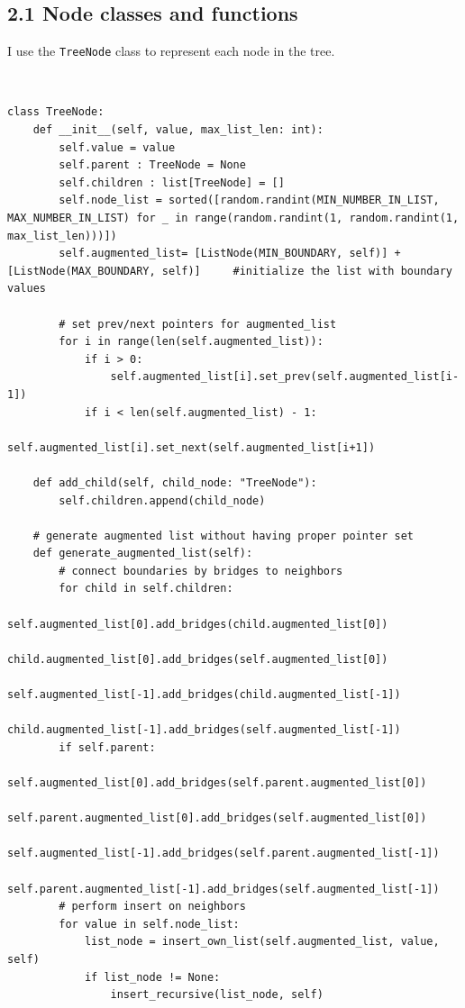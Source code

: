 \documentclass[12pt,english,]{article}
\newcommand{\code}[1]{\colorbox{light-gray}{\texttt{#1}}}
\begin{document}
\hypertarget{section2.1}{%
\subsection{\texorpdfstring{2.1 Node classes and functions}{2.1 Node classes and functions}}\label{section2.1}}

I use the \code{TreeNode} class to represent each node in the tree.

~

\begin{lstlisting}
class TreeNode:
    def __init__(self, value, max_list_len: int):
        self.value = value
        self.parent : TreeNode = None
        self.children : list[TreeNode] = []
        self.node_list = sorted([random.randint(MIN_NUMBER_IN_LIST, MAX_NUMBER_IN_LIST) for _ in range(random.randint(1, random.randint(1, max_list_len)))])
        self.augmented_list= [ListNode(MIN_BOUNDARY, self)] + [ListNode(MAX_BOUNDARY, self)]     #initialize the list with boundary values

        # set prev/next pointers for augmented_list
        for i in range(len(self.augmented_list)):
            if i > 0:
                self.augmented_list[i].set_prev(self.augmented_list[i-1])
            if i < len(self.augmented_list) - 1:
                self.augmented_list[i].set_next(self.augmented_list[i+1])

    def add_child(self, child_node: "TreeNode"):
        self.children.append(child_node)

    # generate augmented list without having proper pointer set
    def generate_augmented_list(self):
        # connect boundaries by bridges to neighbors
        for child in self.children:
            self.augmented_list[0].add_bridges(child.augmented_list[0])
            child.augmented_list[0].add_bridges(self.augmented_list[0])
            self.augmented_list[-1].add_bridges(child.augmented_list[-1])
            child.augmented_list[-1].add_bridges(self.augmented_list[-1])
        if self.parent:
            self.augmented_list[0].add_bridges(self.parent.augmented_list[0])        
            self.parent.augmented_list[0].add_bridges(self.augmented_list[0])   
            self.augmented_list[-1].add_bridges(self.parent.augmented_list[-1])
            self.parent.augmented_list[-1].add_bridges(self.augmented_list[-1])
        # perform insert on neighbors
        for value in self.node_list:
            list_node = insert_own_list(self.augmented_list, value, self)
            if list_node != None:
                insert_recursive(list_node, self)


\end{lstlisting}
\end{document}
